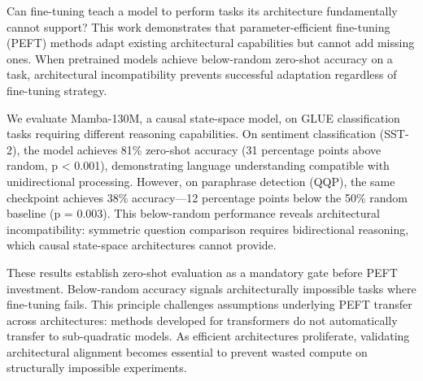 
Can fine-tuning teach a model to perform tasks its architecture fundamentally cannot support? This work demonstrates that parameter-efficient fine-tuning (PEFT) methods adapt existing architectural capabilities but cannot add missing ones. When pretrained models achieve below-random zero-shot accuracy on a task, architectural incompatibility prevents successful adaptation regardless of fine-tuning strategy.

We evaluate Mamba-130M, a causal state-space model, on GLUE classification tasks requiring different reasoning capabilities. On sentiment classification (SST-2), the model achieves 81\% zero-shot accuracy (31 percentage points above random, p < 0.001), demonstrating language understanding compatible with unidirectional processing. However, on paraphrase detection (QQP), the same checkpoint achieves 38\% accuracy---12 percentage points below the 50\% random baseline (p = 0.003). This below-random performance reveals architectural incompatibility: symmetric question comparison requires bidirectional reasoning, which causal state-space architectures cannot provide.

These results establish zero-shot evaluation as a mandatory gate before PEFT investment. Below-random accuracy signals architecturally impossible tasks where fine-tuning fails. This principle challenges assumptions underlying PEFT transfer across architectures: methods developed for transformers do not automatically transfer to sub-quadratic models. As efficient architectures proliferate, validating architectural alignment becomes essential to prevent wasted compute on structurally impossible experiments.
